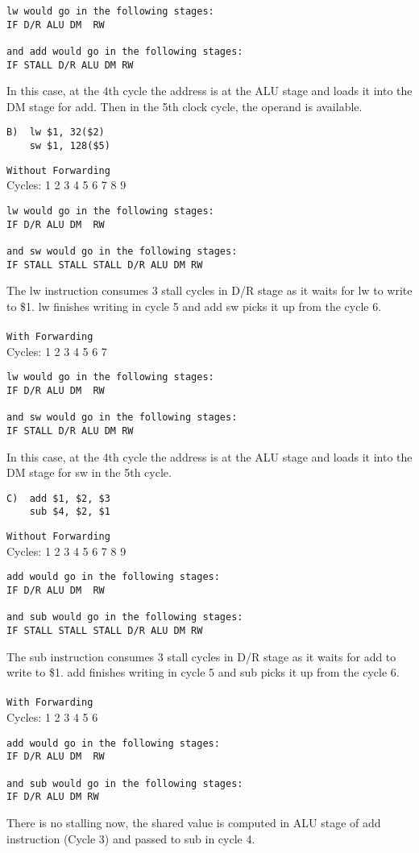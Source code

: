 \documentclass[11pt]{article}
\begin{document}
\begin{verbatim}
lw would go in the following stages:
IF D/R ALU DM  RW

and add would go in the following stages:
IF STALL D/R ALU DM RW
\end{verbatim}
In this case, at the 4th cycle the address is at the ALU stage and loads it into the DM stage for add. Then in the 5th clock cycle, the operand is available.

\begin{verbatim}
B)  lw $1, 32($2) 
    sw $1, 128($5)
\end{verbatim}
\texttt{Without Forwarding}
\\Cycles: 1   2   3   4   5   6   7   8  9

\begin{verbatim}
lw would go in the following stages:
IF D/R ALU DM  RW
    
and sw would go in the following stages:
IF STALL STALL STALL D/R ALU DM RW
\end{verbatim}
The lw instruction consumes 3 stall cycles in D/R stage as it waits for lw to write to \$1.  lw finishes writing in cycle 5 and add sw picks it up from the cycle 6.\\ \\
\texttt{With Forwarding}
\\Cycles: 1   2   3   4   5   6   7

\begin{verbatim}
lw would go in the following stages:
IF D/R ALU DM  RW

and sw would go in the following stages:
IF STALL D/R ALU DM RW
\end{verbatim}
In this case, at the 4th cycle the address is at the ALU stage and loads it into the DM stage for sw in the 5th cycle.


\begin{verbatim}
C)  add $1, $2, $3
    sub $4, $2, $1
\end{verbatim}
\texttt{Without Forwarding}
\\Cycles: 1   2   3   4   5   6   7   8  9

\begin{verbatim}
add would go in the following stages:
IF D/R ALU DM  RW
    
and sub would go in the following stages:
IF STALL STALL STALL D/R ALU DM RW
\end{verbatim}
The sub instruction consumes 3 stall cycles in D/R stage as it waits for add to write to \$1. add finishes writing in cycle 5 and sub picks it up from the cycle 6.\\ \\
\texttt{With Forwarding}
\\Cycles: 1   2   3   4   5   6

\begin{verbatim}
add would go in the following stages:
IF D/R ALU DM  RW
    
and sub would go in the following stages:
IF D/R ALU DM RW
\end{verbatim}
There is no stalling now, the shared value is computed in ALU stage of add instruction (Cycle 3) and passed to sub in cycle 4.
\end{document}
